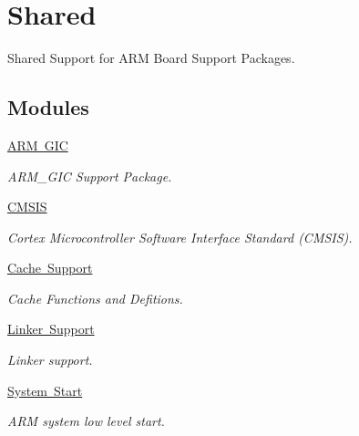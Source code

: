 \hypertarget{group__RTEMSBSPsARMShared}{}\section{Shared}
\label{group__RTEMSBSPsARMShared}


Shared Support for A\+RM Board Support Packages.  


\subsection*{Modules}
\begin{DoxyCompactItemize}
\item 
\mbox{\hyperlink{group__arm__gic}{A\+R\+M G\+IC}}
\begin{DoxyCompactList}\small\item\em A\+R\+M\+\_\+\+G\+IC Support Package. \end{DoxyCompactList}\item 
\mbox{\hyperlink{group__CMSIS}{C\+M\+S\+IS}}
\begin{DoxyCompactList}\small\item\em Cortex Microcontroller Software Interface Standard (C\+M\+S\+IS). \end{DoxyCompactList}\item 
\mbox{\hyperlink{group__L2C-310__cache}{Cache Support}}
\begin{DoxyCompactList}\small\item\em Cache Functions and Defitions. \end{DoxyCompactList}\item 
\mbox{\hyperlink{group__arm__linker}{Linker Support}}
\begin{DoxyCompactList}\small\item\em Linker support. \end{DoxyCompactList}\item 
\mbox{\hyperlink{group__arm__start}{System Start}}
\begin{DoxyCompactList}\small\item\em A\+RM system low level start. \end{DoxyCompactList}\end{DoxyCompactItemize}
